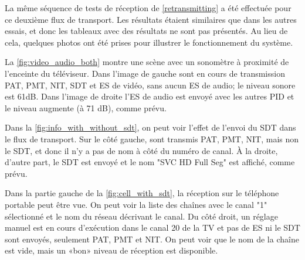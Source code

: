 \documentclass[12pt,a4paper]{article}
\begin{document}



La même séquence de tests de réception de \autoref{retransmitting} a été effectuée pour ce deuxième flux de transport. Les résultats étaient similaires que dans les autres essais, et donc les tableaux avec des résultats ne sont pas présentés. Au lieu de cela, quelques photos ont été prises pour illustrer le fonctionnement du système.

La \autoref{fig:video_audio_both} montre une scène avec un sonomètre à proximité de l'enceinte du téléviseur. Dans l'image de gauche sont en cours de transmission PAT, PMT, NIT, SDT et ES de vidéo, sans aucun ES de audio; le niveau sonore est 61dB. Dans l'image de droite l'ES de audio est envoyé avec les autres PID et le niveau augmente (à 71 dB), comme prévu.

Dans la \autoref{fig:info_with_without_sdt}, on peut voir l'effet de l'envoi du SDT dans le flux de transport. Sur le côté gauche, sont transmis PAT, PMT, NIT, mais non le SDT, et donc il n'y a pas de nom à côté du numéro de canal. À la droite, d'autre part, le SDT est envoyé et le nom "SVC HD Full Seg" est affiché, comme prévu.

Dans la partie gauche de la \autoref{fig:cell_with_sdt}, la réception sur le téléphone portable peut être vue. On peut voir la liste des chaînes avec le canal "1" sélectionné et le nom du réseau décrivant le canal. Du côté droit, un réglage manuel est en cours d'exécution dans le canal 20 de la TV et pas de ES ni le SDT sont envoyés, seulement PAT, PMT et NIT. On peut voir que le nom de la chaîne est vide, mais un «bon» niveau de réception est disponible.
\end{document}

